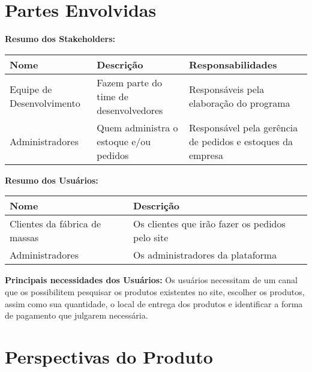 \begin{apendicesenv}
\begin{tabular}{|l|p{3in}|}
\end{tabular}

{\large {\section { Partes Envolvidas \\ } } }
\textbf{Resumo dos Stakeholders:}  \\

\begin{tabular}{|p{2in}|p{2in}|p{2in}|}
  \hline
  \textbf{Nome} & \textbf{Descrição} & \textbf{Responsabilidades} \\ \hline
  Equipe de Desenvolvimento & Fazem parte do time de desenvolvedores & Responsáveis pela elaboração do programa \\ \hline
  Administradores & Quem administra o estoque e/ou pedidos & Responsável pela gerência de pedidos e estoques da empresa \\ \hline

\end{tabular}

\textbf{Resumo dos Usuários:}  \\

\begin{tabular}{|l|p{3in}|}
  \hline
  \textbf{Nome} & \textbf{Descrição} \\ \hline
  Clientes da fábrica de massas & Os clientes que irão fazer os pedidos pelo site \\ \hline
  Administradores & Os administradores da plataforma \\ \hline

\end{tabular}

\textbf{Principais necessidades dos Usuários:} Os usuários necessitam de um canal que os possibilitem pesquisar os produtos existentes no site, escolher os produtos, assim como sua quantidade, o local de entrega dos produtos e identificar a forma de pagamento que julgarem necessária.   \\

{\large {\section { Perspectivas do Produto\\ } } }


\end{apendicesenv}
